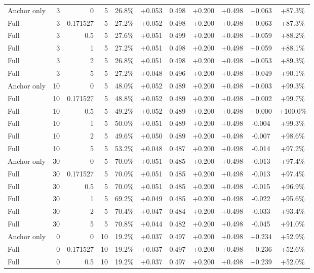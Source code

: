 \begin{table}[htbp]
\begin{tabular}{lrrrccccccc}
Anchor only & 3 & 0 & 5 & 26.8\% & +0.053 & 0.498 & +0.200 & +0.498 & +0.063 & +87.3\% \\
Full & 3 & 0.171527 & 5 & 27.2\% & +0.052 & 0.498 & +0.200 & +0.498 & +0.063 & +87.3\% \\
Full & 3 & 0.5 & 5 & 27.6\% & +0.051 & 0.499 & +0.200 & +0.498 & +0.059 & +88.2\% \\
Full & 3 & 1 & 5 & 27.2\% & +0.051 & 0.498 & +0.200 & +0.498 & +0.059 & +88.1\% \\
Full & 3 & 2 & 5 & 26.8\% & +0.051 & 0.498 & +0.200 & +0.498 & +0.053 & +89.3\% \\
Full & 3 & 5 & 5 & 27.2\% & +0.048 & 0.496 & +0.200 & +0.498 & +0.049 & +90.1\% \\
Anchor only & 10 & 0 & 5 & 48.0\% & +0.052 & 0.489 & +0.200 & +0.498 & +0.003 & +99.3\% \\
Full & 10 & 0.171527 & 5 & 48.8\% & +0.052 & 0.489 & +0.200 & +0.498 & +0.002 & +99.7\% \\
Full & 10 & 0.5 & 5 & 49.2\% & +0.052 & 0.489 & +0.200 & +0.498 & +0.000 & +100.0\% \\
Full & 10 & 1 & 5 & 50.0\% & +0.051 & 0.489 & +0.200 & +0.498 & -0.004 & +99.3\% \\
Full & 10 & 2 & 5 & 49.6\% & +0.050 & 0.489 & +0.200 & +0.498 & -0.007 & +98.6\% \\
Full & 10 & 5 & 5 & 53.2\% & +0.048 & 0.487 & +0.200 & +0.498 & -0.014 & +97.2\% \\
Anchor only & 30 & 0 & 5 & 70.0\% & +0.051 & 0.485 & +0.200 & +0.498 & -0.013 & +97.4\% \\
Full & 30 & 0.171527 & 5 & 70.0\% & +0.051 & 0.485 & +0.200 & +0.498 & -0.013 & +97.4\% \\
Full & 30 & 0.5 & 5 & 70.0\% & +0.051 & 0.485 & +0.200 & +0.498 & -0.015 & +96.9\% \\
Full & 30 & 1 & 5 & 69.2\% & +0.049 & 0.485 & +0.200 & +0.498 & -0.022 & +95.6\% \\
Full & 30 & 2 & 5 & 70.4\% & +0.047 & 0.484 & +0.200 & +0.498 & -0.033 & +93.4\% \\
Full & 30 & 5 & 5 & 70.8\% & +0.044 & 0.482 & +0.200 & +0.498 & -0.045 & +91.0\% \\
Anchor only & 0 & 0 & 10 & 19.2\% & +0.037 & 0.497 & +0.200 & +0.498 & +0.234 & +52.9\% \\
Full & 0 & 0.171527 & 10 & 19.2\% & +0.037 & 0.497 & +0.200 & +0.498 & +0.236 & +52.6\% \\
Full & 0 & 0.5 & 10 & 19.2\% & +0.037 & 0.497 & +0.200 & +0.498 & +0.239 & +52.0\% \\

\end{tabular}
\end{table}
